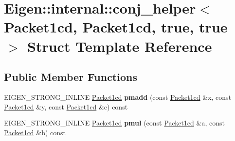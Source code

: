 \hypertarget{struct_eigen_1_1internal_1_1conj__helper_3_01_packet1cd_00_01_packet1cd_00_01true_00_01true_01_4}{}\section{Eigen\+::internal\+::conj\+\_\+helper$<$ Packet1cd, Packet1cd, true, true $>$ Struct Template Reference}
\label{struct_eigen_1_1internal_1_1conj__helper_3_01_packet1cd_00_01_packet1cd_00_01true_00_01true_01_4}
\subsection*{Public Member Functions}
\begin{DoxyCompactItemize}
\item 
\mbox{\label{struct_eigen_1_1internal_1_1conj__helper_3_01_packet1cd_00_01_packet1cd_00_01true_00_01true_01_4_ab0df31eba681670a0a08b1daf8bb9cef}} 
E\+I\+G\+E\+N\+\_\+\+S\+T\+R\+O\+N\+G\+\_\+\+I\+N\+L\+I\+NE \mbox{\hyperlink{struct_eigen_1_1internal_1_1_packet1cd}{Packet1cd}} {\bfseries pmadd} (const \mbox{\hyperlink{struct_eigen_1_1internal_1_1_packet1cd}{Packet1cd}} \&x, const \mbox{\hyperlink{struct_eigen_1_1internal_1_1_packet1cd}{Packet1cd}} \&y, const \mbox{\hyperlink{struct_eigen_1_1internal_1_1_packet1cd}{Packet1cd}} \&c) const
\item 
\mbox{\label{struct_eigen_1_1internal_1_1conj__helper_3_01_packet1cd_00_01_packet1cd_00_01true_00_01true_01_4_a4ef4207a9fe37dbfb82d1f059c27b1b3}} 
E\+I\+G\+E\+N\+\_\+\+S\+T\+R\+O\+N\+G\+\_\+\+I\+N\+L\+I\+NE \mbox{\hyperlink{struct_eigen_1_1internal_1_1_packet1cd}{Packet1cd}} {\bfseries pmul} (const \mbox{\hyperlink{struct_eigen_1_1internal_1_1_packet1cd}{Packet1cd}} \&a, const \mbox{\hyperlink{struct_eigen_1_1internal_1_1_packet1cd}{Packet1cd}} \&b) const
\item 
\mbox{\label{struct_eigen_1_1internal_1_1conj__helper_3_01_packet1cd_00_01_packet1cd_00_01true_00_01true_01_4_ab0df31eba681670a0a08b1daf8bb9cef}} 

\end{DoxyCompactItemize}

